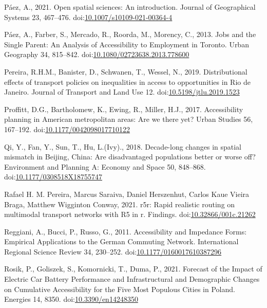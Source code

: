 \documentclass[]{elsarticle} %
\newlength{\cslhangindent}
\newlength{\cslentryspacingunit} %
\newenvironment{CSLReferences}[2] %
 {%
  \setlength{\parindent}{0pt}
  \ifodd #1
  \let\oldpar\par
  \def\par{\hangindent=\cslhangindent\oldpar}
  \fi
  \setlength{\parskip}{#2\cslentryspacingunit}
 }%
 {}
\begin{document}
\begin{CSLReferences}{1}{0}
\leavevmode{}%
Páez, A., 2021. Open spatial sciences: An introduction. Journal of
Geographical Systems 23, 467--476.
doi:\href{https://doi.org/10.1007/s10109-021-00364-4}{10.1007/s10109-021-00364-4}

\leavevmode{}%
Páez, A., Farber, S., Mercado, R., Roorda, M., Morency, C., 2013. Jobs
and the {Single} {Parent}: {An} {Analysis} of {Accessibility} to
{Employment} in {Toronto}. Urban Geography 34, 815--842.
doi:\href{https://doi.org/10.1080/02723638.2013.778600}{10.1080/02723638.2013.778600}

\leavevmode{}%
Pereira, R.H.M., Banister, D., Schwanen, T., Wessel, N., 2019.
Distributional effects of transport policies on inequalities in access
to opportunities in {Rio} de {Janeiro}. Journal of Transport and Land
Use 12.
doi:\href{https://doi.org/10.5198/jtlu.2019.1523}{10.5198/jtlu.2019.1523}

\leavevmode{}%
Proffitt, D.G., Bartholomew, K., Ewing, R., Miller, H.J., 2017.
Accessibility planning in American metropolitan areas: Are we there yet?
Urban Studies 56, 167--192.
doi:\href{https://doi.org/10.1177/0042098017710122}{10.1177/0042098017710122}

\leavevmode{}%
Qi, Y., Fan, Y., Sun, T., Hu, L.(Ivy)., 2018. Decade-long changes in
spatial mismatch in {Beijing}, {China}: {Are} disadvantaged populations
better or worse off? Environment and Planning A: Economy and Space 50,
848--868.
doi:\href{https://doi.org/10.1177/0308518X18755747}{10.1177/0308518X18755747}

\leavevmode{}%
Rafael H. M. Pereira, Marcus Saraiva, Daniel Herszenhut, Carlos Kaue
Vieira Braga, Matthew Wigginton Conway, 2021. r5r: Rapid realistic
routing on multimodal transport networks with R5 in r. Findings.
doi:\href{https://doi.org/10.32866/001c.21262}{10.32866/001c.21262}

\leavevmode{}%
Reggiani, A., Bucci, P., Russo, G., 2011. Accessibility and {Impedance}
{Forms}: {Empirical} {Applications} to the {German} {Commuting}
{Network}. International Regional Science Review 34, 230--252.
doi:\href{https://doi.org/10.1177/0160017610387296}{10.1177/0160017610387296}

\leavevmode{}%
Rosik, P., Goliszek, S., Komornicki, T., Duma, P., 2021. Forecast of the
{Impact} of {Electric} {Car} {Battery} {Performance} and
{Infrastructural} and {Demographic} {Changes} on {Cumulative}
{Accessibility} for the {Five} {Most} {Populous} {Cities} in {Poland}.
Energies 14, 8350.
doi:\href{https://doi.org/10.3390/en14248350}{10.3390/en14248350}


\end{CSLReferences}
\end{document}
